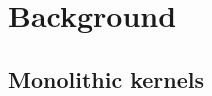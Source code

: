 \documentclass[
a4paper,
12pt,
notitlepage,
parskip=half,
DIV=11,
]{scrbook}
\begin{document}
%		
%		
%		
%		
		
	\chapter{Background}

		
		
		\section{Monolithic kernels}
		
\end{document}

